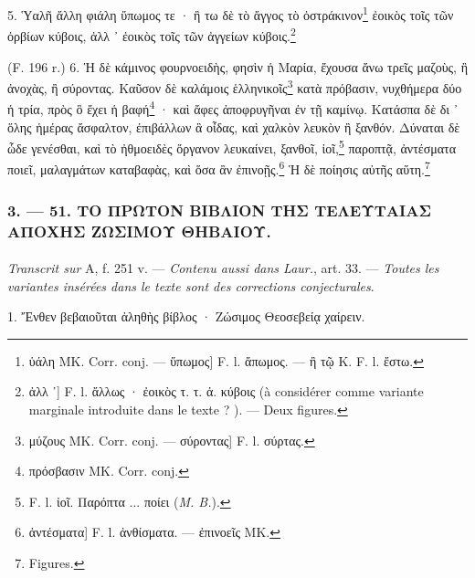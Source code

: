 \documentclass[a4paper, 11pt, oneside, polutonikogreek, french]{article}
\begin{document}
5. Ὑαλῆ ἄλλη φιάλη ὕπωμος τε · ἢ τω δὲ τὸ ἄγγος τὸ ὀστράκινον\footnote{ὑάλη MK. Corr. conj. --- ὕπωμος] F. l. ἄπωμος. --- ἢ τῷ K. F. l. ἔστω.} ἐοικὸς τοῖς τῶν ὀρβίων κύβοις, ἀλλ ᾽ ἐοικὸς τοῖς τῶν ἀγγείων κύβοις.\footnote{ἀλλ ᾽] F. l. ἄλλως · ἐοικὸς τ. τ. ἀ. κύβοις (à considérer comme variante marginale introduite dans le texte ? ). --- Deux figures.}

(F. 196 r.) 6. Ἡ δὲ κάμινος φουρνοειδὴς, φησὶν ἡ Μαρία, ἔχουσα ἄνω τρεῖς μαζοὺς, ἢ ἀνοχὰς, ἢ σύροντας. Καῦσον δὲ καλάμοις ἑλληνικοῖς\footnote{μύζους MK. Corr. conj. --- σύροντας] F. l. σύρτας.} κατὰ πρόβασιν, νυχθήμερα δύο ἡ τρία, πρὸς ὃ ἔχει ἡ βαφή\footnote{πρόσβασιν MK. Corr. conj.} · καὶ ἄφες ἀποφρυγῆναι ἐν τῇ καμίνῳ. Κατάσπα δὲ δι ᾽ ὅλης ἡμέρας ἄσφαλτον, ἐπιβάλλων ἃ οἶδας, καὶ χαλκὸν λευκὸν ἢ ξανθόν. Δύναται δὲ ὧδε γενέσθαι, καὶ τὸ ἠθμοειδὲς ὄργανον λευκαίνει, ξανθοῖ, ἰοῖ,\footnote{F. l. ἰοῖ. Παρόπτα ... ποίει (\emph{M. B.}).} παροπτᾷ, ἀντέσματα ποιεῖ, μαλαγμάτων καταβαφὰς, καὶ ὅσα ἂν ἐπινοῇς.\footnote{ἀντέσματα] F. l. ἀνθίσματα. --- ἐπινοεῖς MK.} Ἡ δὲ ποίησις αὐτῆς αὕτη.\footnote{Figures.}

\bigskip
\centerline{\EightStarTaper}
\centerline{\EightStarTaper\EightStarTaper}
\bigskip

\subsubsection{3. --- 51. ΤΟ ΠΡΩΤΟΝ ΒΙΒΛΙΟΝ ΤΗΣ ΤΕΛΕΥΤΑΙΑΣ ΑΠΟΧΗΣ ΖΩΣΙΜΟΥ ΘΗΒΑΙΟΥ.}
\paragraph{}
\emph{Transcrit sur} A, f. 251 v. --- \emph{Contenu aussi dans Laur.}, art. 33. --- \emph{Toutes les variantes insérées dans le texte sont des corrections conjecturales}.

\bigskip

1. Ἔνθεν βεβαιοῦται ἀληθὴς βίβλος · Ζώσιμος Θεοσεβείᾳ χαίρειν.
\end{document}
